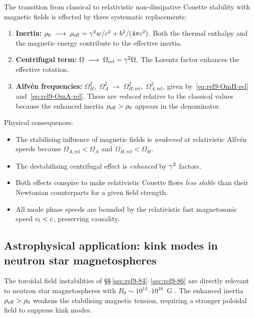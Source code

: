 \begin{relcorrection}
The transition from classical to relativistic non-dissipative
Couette stability with magnetic fields is effected by three
systematic replacements:
\begin{enumerate}
\item \textbf{Inertia:}
  $\rho_0 \;\longrightarrow\; \rho_{\mathrm{eff}}
  = \gamma^{2}w/c^{2} + b^2/(4\pi c^{2})$.
  Both the thermal enthalpy and the magnetic energy contribute
  to the effective inertia.

\item \textbf{Centrifugal term:}
  $\Omega \;\longrightarrow\; \Omega_{\mathrm{rel}} = \gamma^{2}\Omega$.
  The Lorentz factor enhances the effective rotation.

\item \textbf{Alfv\'en frequencies:}
  $\Omega_H^{2},\;\Omega_A^{2} \;\longrightarrow\;
  \Omega_{H,\mathrm{rel}}^{2},\;\Omega_{A,\mathrm{rel}}^{2}$,
  given by~\eqref{eq:rel9-OmH-rel} and~\eqref{eq:rel9-OmA-rel}.
  These are \emph{reduced} relative to the classical values because
  the enhanced inertia $\rho_{\mathrm{eff}} > \rho_0$ appears
  in the denominator.
\end{enumerate}

Physical consequences:
\begin{itemize}
\item The stabilising influence of magnetic fields is
  \emph{weakened} at relativistic Alfv\'en speeds because
  $\Omega_{A,\mathrm{rel}} < \Omega_A$ and
  $\Omega_{H,\mathrm{rel}} < \Omega_H$.
\item The destabilising centrifugal effect is
  \emph{enhanced} by $\gamma^{2}$ factors.
\item Both effects conspire to make relativistic Couette flows
  \emph{less stable} than their Newtonian counterparts for a given
  field strength.
\item All mode phase speeds are bounded by the relativistic
  fast magnetosonic speed $v_{\mathrm{f}} < c$, preserving causality.
\end{itemize}
\end{relcorrection}

\subsection{Astrophysical application: kink modes in neutron star
  magnetospheres}
\label{sec:rel9-86-astro}

The toroidal field instabilities of \S\S\,\ref{sec:rel9-84}--\ref{sec:rel9-86}
are directly relevant to neutron star magnetospheres with
$B_\theta \sim 10^{14}$--$10^{16}$~G \cite{Braithwaite2009,Lasky2015}.
The enhanced inertia $\rho_{\mathrm{eff}} > \rho_0$ weakens the
stabilising magnetic tension, requiring a stronger poloidal field to
suppress kink modes.

